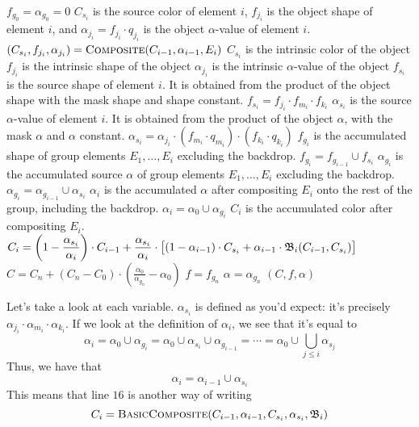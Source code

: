 \algorithm
{}
    \State $f_{g_0}=\alpha_{g_0}=0$
        \Comment
            $C_{s_i}$ is the source color of element $i$, $f_{j_i}$ is the object shape of element $i$,\cr
            and $\alpha_{j_i}=f_{j_i}\cdot q_{j_i}$ is the object $\alpha$-value of element $i$.
        \EndComment
            \State $(C_{s_i},f_{j_i},\alpha_{j_i})=\hbox{\sc Composite}(C_{i-1},\alpha_{i-1},E_i)$
            \State $C_{s_i}$ is the intrinsic color of the object
            \State $f_{j_i}$ is the intrinsic shape of the object
            \State $\alpha_{j_i}$ is the intrinsic $\alpha$-value of the object
        \EndIf
        \Comment
            $f_{s_i}$ is the source shape of element $i$.\cr
            It is obtained from the product of the object shape with the mask shape and
            shape constant.
        \EndComment
        \State $f_{s_i}=f_{j_i}\cdot f_{m_i}\cdot f_{k_i}$
        \Comment
            $\alpha_{s_i}$ is the source $\alpha$-value of element $i$.\cr
            It is obtained from the product of the object $\alpha$, with the mask $\alpha$ and
            $\alpha$ constant.
        \EndComment
        \State $\alpha_{s_i}=\alpha_{j_i}\cdot(f_{m_i}\cdot q_{m_i})\cdot(f_{k_i}\cdot q_{k_i})$
        \Comment
            $f_{g_i}$ is the accumulated shape of group elements $E_1,\dots,E_i$ excluding the backdrop.
        \EndComment
        \State $f_{g_i}=f_{g_{i-1}}\cup f_{s_i}$
        \Comment
            $\alpha_{g_i}$ is the accumulated source $\alpha$ of group elements $E_1,\dots,E_i$ excluding the
            backdrop.
        \EndComment
        \State $\alpha_{g_i}=\alpha_{g_{i-1}}\cup\alpha_{s_i}$
        \Comment
            $\alpha_i$ is the accumulated $\alpha$ after compositing $E_i$ onto the rest of the group,
            including the backdrop.
        \EndComment
        \State $\alpha_i=\alpha_0\cup\alpha_{g_i}$
        \Comment
            $C_i$ is the accumulated color after compositing $E_i$.
        \EndComment
        \State $\displaystyle C_i=\left(1-\frac{\alpha_{s_i}}{\alpha_i}\right)\cdot C_{i-1}
        +\frac{\alpha_{s_i}}{\alpha_i}\cdot\bigl[(1-\alpha_{i-1})\cdot C_{s_i}+\alpha_{i-1}\cdot%
        \B_i(C_{i-1},C_{s_i})\bigr]$
    \EndFor
    \State $C=C_n+(C_n-C_0)\cdot\left(\frac{\alpha_0}{\alpha_{g_n}}-\alpha_0\right)$
    \State $f=f_{g_n}$
    \State $\alpha=\alpha_{g_n}$
    \State\Return $(C,f,\alpha)$
\EndFunc
\ealgorithm

Let's take a look at each variable.
$\alpha_{s_i}$ is defined as you'd expect: it's precisely $\alpha_{j_i}\cdot\alpha_{m_i}\cdot\alpha_{k_i}$.
If we look at the definition of $\alpha_i$, we see that it's equal to
$$ \alpha_i = \alpha_0\cup\alpha_{g_i} = \alpha_0\cup\alpha_{s_i}\cup\alpha_{g_{i-1}} = \cdots =
\alpha_0\cup\bigcup_{j\leq i}\alpha_{s_j} $$
Thus, we have that
$$ \alpha_i = \alpha_{i-1} \cup \alpha_{s_i} $$
This means that line $16$ is another way of writing
$$ C_i = \hbox{\sc BasicComposite}(C_{i-1},\alpha_{i-1},C_{s_i},\alpha_{s_i},{\frak B}_i) $$

